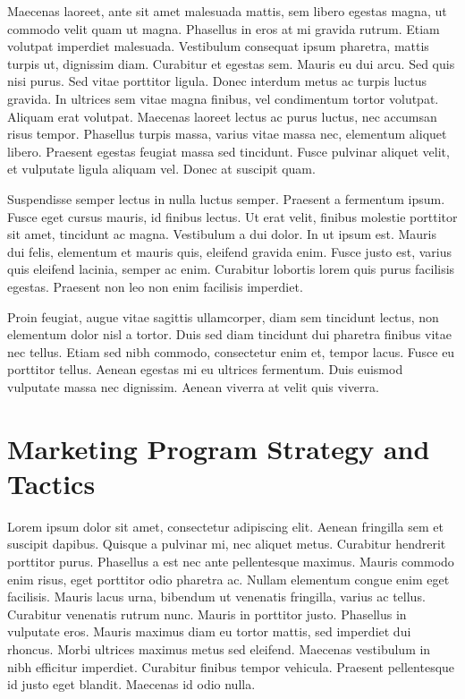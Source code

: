 \documentclass[12pt, letterpaper]{article}
\begin{document}
Maecenas laoreet, ante sit amet malesuada mattis, sem libero egestas magna, ut commodo velit quam ut magna. Phasellus in eros at mi gravida rutrum. Etiam volutpat imperdiet malesuada. Vestibulum consequat ipsum pharetra, mattis turpis ut, dignissim diam. Curabitur et egestas sem. Mauris eu dui arcu. Sed quis nisi purus. Sed vitae porttitor ligula. Donec interdum metus ac turpis luctus gravida. In ultrices sem vitae magna finibus, vel condimentum tortor volutpat. Aliquam erat volutpat. Maecenas laoreet lectus ac purus luctus, nec accumsan risus tempor. Phasellus turpis massa, varius vitae massa nec, elementum aliquet libero. Praesent egestas feugiat massa sed tincidunt. Fusce pulvinar aliquet velit, et vulputate ligula aliquam vel. Donec at suscipit quam.

Suspendisse semper lectus in nulla luctus semper. Praesent a fermentum ipsum. Fusce eget cursus mauris, id finibus lectus. Ut erat velit, finibus molestie porttitor sit amet, tincidunt ac magna. Vestibulum a dui dolor. In ut ipsum est. Mauris dui felis, elementum et mauris quis, eleifend gravida enim. Fusce justo est, varius quis eleifend lacinia, semper ac enim. Curabitur lobortis lorem quis purus facilisis egestas. Praesent non leo non enim facilisis imperdiet.

Proin feugiat, augue vitae sagittis ullamcorper, diam sem tincidunt lectus, non elementum dolor nisl a tortor. Duis sed diam tincidunt dui pharetra finibus vitae nec tellus. Etiam sed nibh commodo, consectetur enim et, tempor lacus. Fusce eu porttitor tellus. Aenean egestas mi eu ultrices fermentum. Duis euismod vulputate massa nec dignissim. Aenean viverra at velit quis viverra.

\section{Marketing Program Strategy and Tactics}
Lorem ipsum dolor sit amet, consectetur adipiscing elit. Aenean fringilla sem et suscipit dapibus. Quisque a pulvinar mi, nec aliquet metus. Curabitur hendrerit porttitor purus. Phasellus a est nec ante pellentesque maximus. Mauris commodo enim risus, eget porttitor odio pharetra ac. Nullam elementum congue enim eget facilisis. Mauris lacus urna, bibendum ut venenatis fringilla, varius ac tellus. Curabitur venenatis rutrum nunc. Mauris in porttitor justo. Phasellus in vulputate eros. Mauris maximus diam eu tortor mattis, sed imperdiet dui rhoncus. Morbi ultrices maximus metus sed eleifend. Maecenas vestibulum in nibh efficitur imperdiet. Curabitur finibus tempor vehicula. Praesent pellentesque id justo eget blandit. Maecenas id odio nulla.
\end{document}
